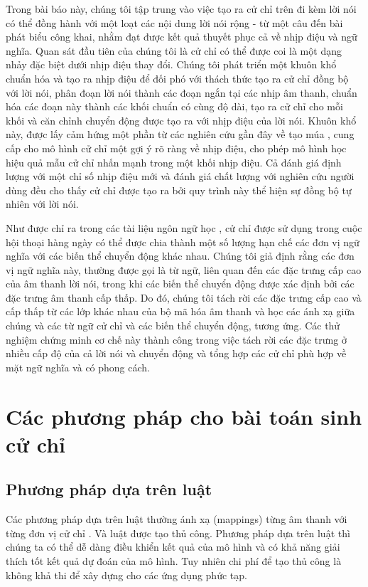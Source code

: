 Trong bài báo này, chúng tôi tập trung vào việc tạo ra cử chỉ trên đi kèm lời nói có thể đồng hành với một loạt các nội dung lời nói rộng - từ một câu đến bài phát biểu công khai, nhằm đạt được kết quả thuyết phục cả về nhịp điệu và ngữ nghĩa. Quan sát đầu tiên của chúng tôi là cử chỉ có thể được coi là một dạng nhảy đặc biệt dưới nhịp điệu thay đổi. Chúng tôi phát triển một khuôn khổ chuẩn hóa và tạo ra nhịp điệu để đối phó với thách thức tạo ra cử chỉ đồng bộ với lời nói, phân đoạn lời nói thành các đoạn ngắn tại các nhịp âm thanh, chuẩn hóa các đoạn này thành các khối chuẩn có cùng độ dài, tạo ra cử chỉ cho mỗi khối và căn chỉnh chuyển động được tạo ra với nhịp điệu của lời nói. Khuôn khổ này, được lấy cảm hứng một phần từ các nghiên cứu gần đây về tạo múa \cite{aristidou2022rhythm}, cung cấp cho mô hình cử chỉ một gợi ý rõ ràng về nhịp điệu, cho phép mô hình học hiệu quả mẫu cử chỉ nhấn mạnh trong một khối nhịp điệu. Cả đánh giá định lượng với một chỉ số nhịp điệu mới và đánh giá chất lượng với nghiên cứu người dùng đều cho thấy cử chỉ được tạo ra bởi quy trình này thể hiện sự đồng bộ tự nhiên với lời nói.

Như được chỉ ra trong các tài liệu ngôn ngữ học \cite{kipp2005gesture} \cite{neff2008gesture} \cite{webb1997linguistic},
cử chỉ được sử dụng trong cuộc hội thoại hàng ngày có thể được chia thành một số lượng hạn chế các đơn vị ngữ nghĩa với các biến thể chuyển động khác nhau. Chúng tôi giả định rằng các đơn vị ngữ nghĩa này, thường được gọi là từ ngữ, liên quan đến các đặc trưng cấp cao của âm thanh lời nói, trong khi các biến thể chuyển động được xác định bởi các đặc trưng âm thanh cấp thấp. Do đó, chúng tôi tách rời các đặc trưng cấp cao và cấp thấp từ các lớp khác nhau của bộ mã hóa âm thanh và học các ánh xạ giữa chúng và các từ ngữ cử chỉ và các biến thể chuyển động, tương ứng. Các thử nghiệm chứng minh cơ chế này thành công trong việc tách rời các đặc trưng ở nhiều cấp độ của cả lời nói và chuyển động và tổng hợp các cử chỉ phù hợp về mặt ngữ nghĩa và có phong cách.

\section{Các phương pháp cho bài toán sinh cử chỉ}

\subsection{Phương pháp dựa trên luật}

Các phương pháp dựa trên luật thường ánh xạ (mappings) từng âm thanh với từng đơn vị cử chỉ \cite{huang2012robot}. Và luật được tạo thủ công. Phương pháp dựa trên luật thì chúng ta có thể dễ dàng điều khiển kết quả của mô hình và có khả năng giải thích tốt kết quả dự đoán của mô hình.
Tuy nhiên chi phí để tạo thủ công là không khả thi để xây dựng cho các ứng dụng phức tạp.

